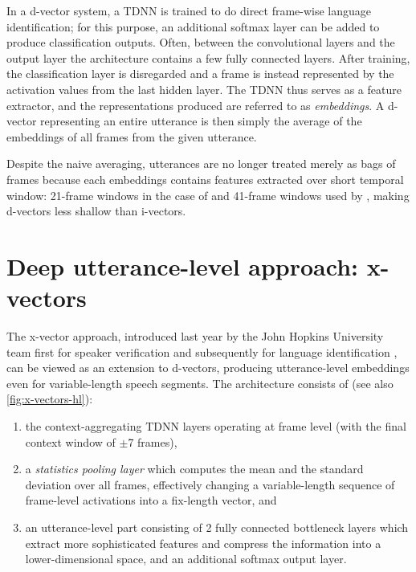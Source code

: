 \documentclass[bsc,frontabs,twoside,singlespacing,parskip,deptreport]{infthesis}
\begin{document}
{{    %
    In a d-vector system, a TDNN is trained to do direct frame-wise language identification; for this purpose, an additional softmax layer can be added to produce classification outputs. Often, between the convolutional layers and the output layer the architecture contains a few fully connected layers. After training, the classification layer is disregarded and a frame is instead represented by the activation values from the last hidden layer. The TDNN thus serves as a feature extractor, and the representations produced are referred to as \textit{embeddings}.
    A d-vector representing an entire utterance is then simply the average of the embeddings of all frames from the given utterance.
    
    Despite the naive averaging, utterances are no longer treated merely as bags of frames because each embeddings contains features extracted over short temporal window: 21-frame windows in the case of \citeauthor{dvectors_lid} and 41-frame windows used by \citeauthor{Variani_et_al_2014}, making d-vectors less shallow than i-vectors.
  }

  \section{Deep utterance-level approach: x-vectors}{
    \label{sec:x-vectors}
    The x-vector approach, introduced last year by the John Hopkins University team first for speaker verification \citep{Snyder_et_al_2018b} and subsequently for language identification \citep{Snyder_et_al_2018}, can be viewed as an extension to d-vectors, producing utterance-level embeddings even for variable-length speech segments. The architecture consists of (see also \autoref{fig:x-vectors-hl}):
    \begin{enumerate}
      \item {the context-aggregating TDNN layers operating at frame level (with the final context window of $\pm$7 frames),}
      \item {a \textit{statistics pooling layer} which computes the mean and the standard deviation over all frames, effectively changing a variable-length sequence of frame-level activations into a fix-length vector, and}
      \item {an utterance-level part consisting of 2 fully connected bottleneck layers which extract more sophisticated features and compress the information into a lower-dimensional space, and an additional softmax output layer.}
    \end{enumerate}
    
}}
\end{document}
